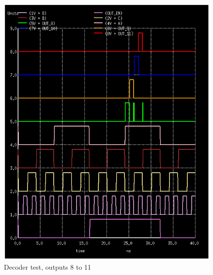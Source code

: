 \documentclass[12pt]{report}
\begin{document}
\begin{figure}[H]
  \centering
    \includegraphics[width=1.0\textwidth]{decoder_test_8_to_11.PNG}
  \caption{Decoder test, outputs 8 to 11}
  \label{fig:decoder_test_8_to_11}
\end{figure}
\end{document}
